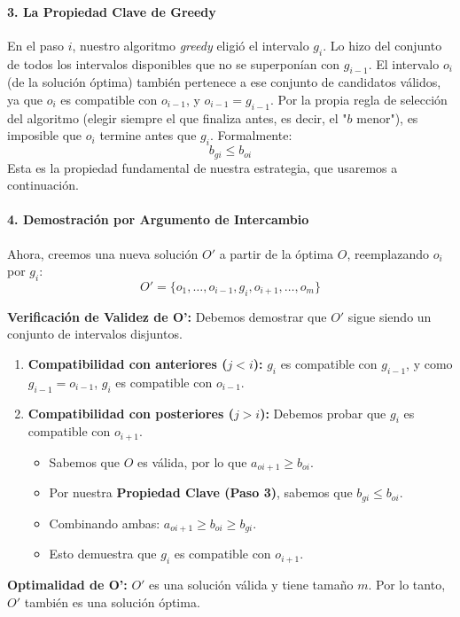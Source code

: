 \documentclass[12pt, a4paper]{article}
\begin{document}
\paragraph{3. La Propiedad Clave de Greedy}
En el paso $i$, nuestro algoritmo \textit{greedy} eligió el intervalo $g_i$. Lo hizo del conjunto de 
todos los intervalos disponibles que no se superponían con $g_{i-1}$.
El intervalo $o_i$ (de la solución óptima) también pertenece a ese conjunto de candidatos válidos, 
ya que $o_i$ es compatible con $o_{i-1}$, y $o_{i-1} = g_{i-1}$.
Por la propia regla de selección del algoritmo (elegir siempre el que finaliza antes, es decir, el "$b$ menor"), es 
imposible que $o_i$ termine antes que $g_i$. Formalmente:
\[ b_{gi} \le b_{oi} \]
Esta es la propiedad fundamental de nuestra estrategia, que usaremos a continuación.

\paragraph{4. Demostración por Argumento de Intercambio}
Ahora, creemos una nueva solución $O'$ a partir de la óptima $O$, reemplazando $o_i$ por $g_i$:
\[ O' = \{o_1, \dots, o_{i-1}, g_i, o_{i+1}, \dots, o_m\} \]

\textbf{Verificación de Validez de O':} Debemos demostrar que $O'$ sigue siendo un conjunto de intervalos disjuntos.
    \begin{enumerate}
        \item \textbf{Compatibilidad con anteriores ($j < i$):} $g_i$ es compatible con $g_{i-1}$, y como $g_{i-1} = o_{i-1}$, $g_i$ es compatible con $o_{i-1}$.
        \item \textbf{Compatibilidad con posteriores ($j > i$):} Debemos probar que $g_i$ es compatible con $o_{i+1}$.
        \begin{itemize}
            \item Sabemos que $O$ es válida, por lo que $a_{oi+1}\ge b_{oi}$.
            \item Por nuestra \textbf{Propiedad Clave (Paso 3)}, sabemos que $b_{gi} \le b_{oi}$.
            \item Combinando ambas: $a_{oi+1} \ge b_{oi} \ge b_{gi}$.
            \item Esto demuestra que $g_i$ es compatible con $o_{i+1}$.
        \end{itemize}
    \end{enumerate}
\textbf{Optimalidad de O':} $O'$ es una solución válida y tiene tamaño $m$. Por lo tanto, $O'$ 
también es una solución óptima.
\end{document}
